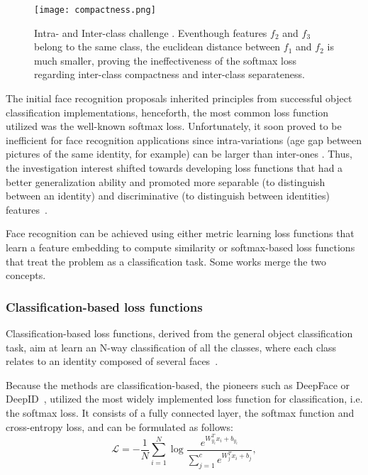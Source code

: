\documentclass[class=report, crop=false, a4paper, 12pt]{standalone}
\begin{document}
\begin{figure}[!h]
    \centering
    \texttt{[image: compactness.png]}
    \caption{Intra- and Inter-class challenge \autocite{wangNormFaceL2Hypersphere2017}. Eventhough features $f_2$ and $f_3$ belong to the same class, the euclidean distance between $f_1$ and $f_2$ is much smaller, proving the ineffectiveness of the softmax loss regarding inter-class compactness and inter-class separateness.}
    \label{fig:compactness}
\end{figure}

The initial face recognition proposals inherited principles from successful object classification implementations, henceforth, the most common loss function utilized was the well-known softmax loss. Unfortunately, it soon proved to be inefficient for face recognition applications since intra-variations (age gap between pictures of the same identity, for example) can be larger than inter-ones . Thus, the investigation interest shifted towards developing loss functions that had a better generalization ability and promoted more separable (to distinguish between an identity) and discriminative (to distinguish between identities) features~\autocite{wangDeepFaceRecognition2021}.
\par Face recognition can be achieved using either metric learning loss functions that learn a feature embedding to compute similarity or softmax-based loss functions that treat the problem as a classification task. Some works merge the two concepts.

\subsubsection{Classification-based loss functions}
Classification-based loss functions, derived from the general object classification task, aim at learn an N-way classification of all the classes, where each class relates to an identity composed of several faces~\autocite{duElementsEndtoendDeep2022}.
\par Because the methods are classification-based, the pioneers such as DeepFace or DeepID~\autocite{sunDeepLearningFace2014a}, utilized the most widely implemented loss function for classification, i.e. the softmax loss. It consists of a fully connected layer, the softmax function and cross-entropy loss, and can be formulated as follows:
\begin{equation}
\mathcal{L} = -\frac{1}{N}\sum_{i=1}^{N}\log{\frac{e^{W_{y_i}^{T}x_i+b_{y_i}}}{\sum_{j=1}^{c}e^{W_{j}^{T}x_i+b_{j}}}},
\end{equation}
\end{document}
